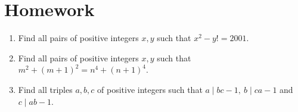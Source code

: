 \documentclass{article}
\begin{document}
\section{Homework}
\begin{enumerate}
	\item Find all pairs of positive integers $x,y$ such that $x^2-y!=2001$.
	\item Find all pairs of positive integers $x,y$ such that $m^2+(m+1)^2=n^4+(n+1)^4$.
	\item Find all triples $a,b,c$ of positive integers such that $a\mid bc-1,\
		      b\mid ca-1$ and $c\mid ab-1$.
\end{enumerate}
\end{document}
